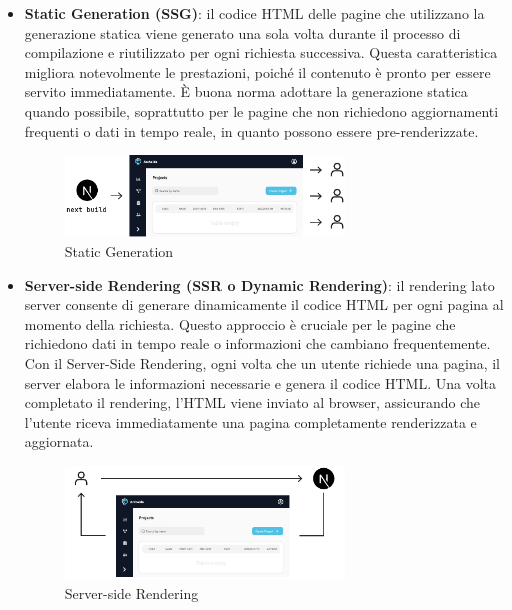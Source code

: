 \documentclass[target=bach,aauheader=,style=]{thud}
\begin{document}
\begin{itemize}
    \item \textbf{Static Generation (SSG)}: il codice HTML delle pagine che utilizzano la generazione statica viene generato una sola volta durante il processo di compilazione e riutilizzato per ogni richiesta successiva. Questa caratteristica migliora notevolmente le prestazioni, poiché il contenuto è pronto per essere servito immediatamente. È buona norma adottare la generazione statica quando possibile, soprattutto per le pagine che non richiedono aggiornamenti frequenti o dati in tempo reale, in quanto possono essere pre-renderizzate.
    \begin{figure}[H]
        \centering
        \includegraphics[width=0.7\textwidth]{img/rendering/static_generation.pdf} 
        \caption{Static Generation}
    \end{figure}
    
    
    \item \textbf{Server-side Rendering (SSR o Dynamic Rendering)}: il rendering lato server consente di generare dinamicamente il codice HTML per ogni pagina al momento della richiesta. Questo approccio è cruciale per le pagine che richiedono dati in tempo reale o informazioni che cambiano frequentemente. Con il Server-Side Rendering, ogni volta che un utente richiede una pagina, il server elabora le informazioni necessarie e genera il codice HTML. Una volta completato il rendering, l'HTML viene inviato al browser, assicurando che l'utente riceva immediatamente una pagina completamente renderizzata e aggiornata.
     \begin{figure}[H]
        \centering
        \includegraphics[width=0.7\textwidth]{img/rendering/server_side_rendering.pdf} 
        \caption{Server-side Rendering}
    \end{figure}
\end{itemize}
\end{document}
